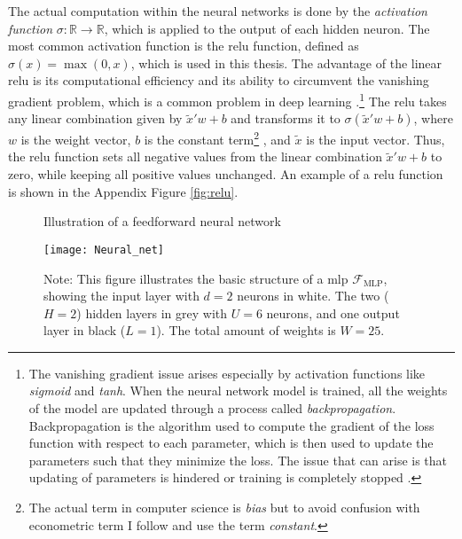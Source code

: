 The actual computation within the neural networks is done by the \textit{activation function} $ \sigma : \mathbb{R} \to \mathbb{R} $, which is applied to the output of each hidden neuron.
The most common activation function is the \ac{relu} function, defined as $ \sigma(x) = \max(0, x) $, which is used in this thesis.
The advantage of the linear \ac{relu} is its computational efficiency and its ability to circumvent the vanishing gradient problem, which is a common problem in deep learning \citep{10.1214/19-AOS1875}.\footnote[1]{The vanishing gradient issue arises especially by activation functions like \textit{sigmoid} and \textit{tanh}.
When the neural network model is trained, all the weights of the model are updated through a process called \textit{backpropagation}.
Backpropagation is the algorithm used to compute the gradient of the loss function with respect to each parameter, which is then used to update the parameters such that they minimize the loss.
The issue that can arise is that updating of parameters is hindered or training is completely stopped \citep{abuqaddom2021oriented}.}
The \ac{relu} takes any linear combination given by $\tilde{x}' w + b$ and transforms it to $ \sigma(\tilde{x}' w + b)$, where $w$ is the weight vector, $b$ is the constant term\footnote[2]{The actual term in computer science is \textit{bias} but to avoid confusion with econometric term I follow \citet{farrellDeepNeuralNetworks2021} and use the term \textit{constant}.}
, and $\tilde{x}$ is the input vector.
Thus, the \ac{relu} function sets all negative values from the linear combination $\tilde{x}' w + b$ to zero, while keeping all positive values unchanged.
An example of a \ac{relu} function is shown in the Appendix Figure \ref{fig:relu}.
\begin{figure}%
\centering
\caption{Illustration of a feedforward neural network \citep{farrellDeepNeuralNetworks2021}}
\texttt{[image: Neural\_net]}
\caption*{Note: This figure illustrates the basic structure of a \ac{mlp} $\mathcal{F}_{\text{MLP}}$, showing the input layer with $d=2$ neurons in white. The two ($H=2$) hidden layers in grey with $U=6$ neurons, and one output layer in black ($L=1$). The total amount of weights is $W=25$.}
\label{fig:1}
\end{figure}


